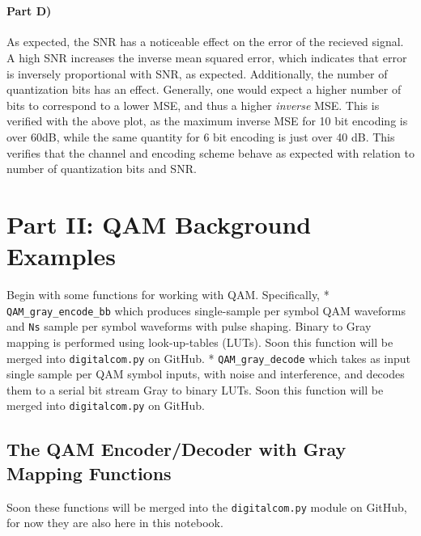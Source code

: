 \documentclass[11pt]{article}
\begin{document}
    \begin{center}
    \end{center}
    { \hspace*{\fill} \\}
    
    \paragraph{Part D)}\label{part-d}

As expected, the SNR has a noticeable effect on the error of the
recieved signal. A high SNR increases the inverse mean squared error,
which indicates that error is inversely proportional with SNR, as
expected. Additionally, the number of quantization bits has an effect.
Generally, one would expect a higher number of bits to correspond to a
lower MSE, and thus a higher \emph{inverse} MSE. This is verified with
the above plot, as the maximum inverse MSE for 10 bit encoding is over
60dB, while the same quantity for 6 bit encoding is just over 40 dB.
This verifies that the channel and encoding scheme behave as expected
with relation to number of quantization bits and SNR.

    \section{Part II: QAM Background
Examples}\label{part-ii-qam-background-examples}

Begin with some functions for working with QAM. Specifically, *
\texttt{QAM\_gray\_encode\_bb} which produces single-sample per symbol
QAM waveforms and \texttt{Ns} sample per symbol waveforms with pulse
shaping. Binary to Gray mapping is performed using look-up-tables
(LUTs). Soon this function will be merged into \texttt{digitalcom.py} on
GitHub. * \texttt{QAM\_gray\_decode} which takes as input single sample
per QAM symbol inputs, with noise and interference, and decodes them to
a serial bit stream Gray to binary LUTs. Soon this function will be
merged into \texttt{digitalcom.py} on GitHub.

\subsection{The QAM Encoder/Decoder with Gray Mapping
Functions}\label{the-qam-encoderdecoder-with-gray-mapping-functions}

Soon these functions will be merged into the \texttt{digitalcom.py}
module on GitHub, for now they are also here in this notebook.
\end{document}

